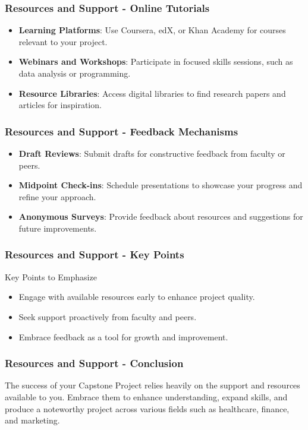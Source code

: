 \documentclass[aspectratio=169]{beamer}
\begin{document}
\begin{frame}[fragile]
    \frametitle{Resources and Support - Online Tutorials}
    \begin{itemize}
        \item \textbf{Learning Platforms}: Use Coursera, edX, or Khan Academy for courses relevant to your project.
        \item \textbf{Webinars and Workshops}: Participate in focused skills sessions, such as data analysis or programming.
        \item \textbf{Resource Libraries}: Access digital libraries to find research papers and articles for inspiration.
    \end{itemize}
\end{frame}

\begin{frame}[fragile]
    \frametitle{Resources and Support - Feedback Mechanisms}
    \begin{itemize}
        \item \textbf{Draft Reviews}: Submit drafts for constructive feedback from faculty or peers.
        \item \textbf{Midpoint Check-ins}: Schedule presentations to showcase your progress and refine your approach.
        \item \textbf{Anonymous Surveys}: Provide feedback about resources and suggestions for future improvements.
    \end{itemize}
\end{frame}

\begin{frame}[fragile]
    \frametitle{Resources and Support - Key Points}
    \begin{block}{Key Points to Emphasize}
        \begin{itemize}
            \item Engage with available resources early to enhance project quality.
            \item Seek support proactively from faculty and peers.
            \item Embrace feedback as a tool for growth and improvement.
        \end{itemize}
    \end{block}
\end{frame}

\begin{frame}[fragile]
    \frametitle{Resources and Support - Conclusion}
    The success of your Capstone Project relies heavily on the support and resources available to you. Embrace them to enhance understanding, expand skills, and produce a noteworthy project across various fields such as healthcare, finance, and marketing.
\end{frame}
\end{document}
